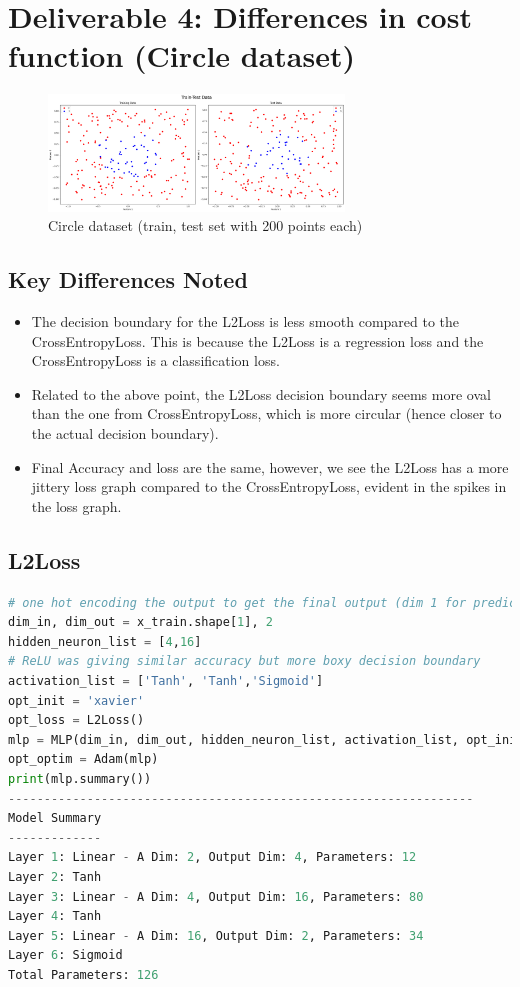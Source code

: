 
\section{Deliverable 4: Differences in cost function (Circle dataset)}


\begin{solve}    

\begin{figure}[H]
    \centering
    \includegraphics[width=0.7\textwidth]{plots/4_circle_dataset.png}
    \caption{Circle dataset (train, test set with 200 points each)}
\end{figure}

\subsection*{Key Differences Noted}
\begin{itemize}
    \item The decision boundary for the L2Loss is less smooth compared to the CrossEntropyLoss. This is because the L2Loss is a regression loss and the CrossEntropyLoss is a classification loss.
    \item Related to the above point, the L2Loss decision boundary seems more oval than the one from CrossEntropyLoss, which is more circular (hence closer to the actual decision boundary).
    \item Final Accuracy and loss are the same, however, we see the L2Loss has a more jittery loss graph compared to the CrossEntropyLoss, evident in the spikes in the loss graph.
\end{itemize}


\subsection{L2Loss}

\begin{lstlisting}[language=python]
# one hot encoding the output to get the final output (dim 1 for prediction)
dim_in, dim_out = x_train.shape[1], 2
hidden_neuron_list = [4,16]
# ReLU was giving similar accuracy but more boxy decision boundary
activation_list = ['Tanh', 'Tanh','Sigmoid']
opt_init = 'xavier'
opt_loss = L2Loss()
mlp = MLP(dim_in, dim_out, hidden_neuron_list, activation_list, opt_init)
opt_optim = Adam(mlp)
print(mlp.summary())
-----------------------------------------------------------------
Model Summary
-------------
Layer 1: Linear - A Dim: 2, Output Dim: 4, Parameters: 12
Layer 2: Tanh
Layer 3: Linear - A Dim: 4, Output Dim: 16, Parameters: 80
Layer 4: Tanh
Layer 5: Linear - A Dim: 16, Output Dim: 2, Parameters: 34
Layer 6: Sigmoid
Total Parameters: 126
\end{lstlisting}


\end{solve}
